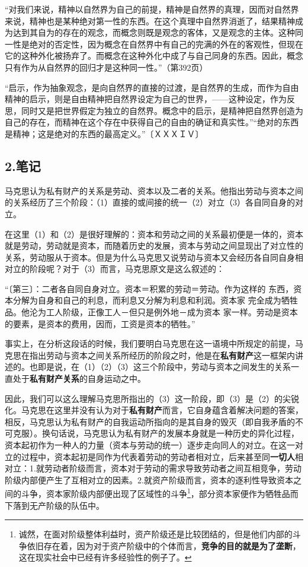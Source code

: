 \documentclass[a4paper,twoside,12pt]{ctexart}
\begin{document}
\begin{fangsong}
“对我们来说，精神以自然界为自己的前提，精神是自然界的真理，因而对自然界来说，精神也是某种绝对第一性的东西。在这个真理中自然界消逝了，结果精神成为达到其自为的存在的观念，而概念则既是观念的客体，又是观念的主体。这种同一性是绝对的否定性，因为概念在自然界中有自己的完满的外在的客观性，但现在它的这种外化被扬弃了。而概念在这种外化中成了与自己同身的东西。因此，概念只有作为从自然界的回归才是这种同一性。”（第392页）

“启示，作为抽象观念，是向自然界的直接的过渡，是自然界的生成，而作为自由精神的启示，则是自由精神把自然界设定为自己的世界，——这种设定，作为反思，同时又是把世界假定为独立的自然界。概念中的启示，是精神把自然界创造为自己的存在，而精神在这个存在中获得自己的自由的确证和真实性。”“绝对的东西是精神；这是绝对的东西的最高定义。”〔ＸＸＸＩＶ〕
\end{fangsong}

\newpage
\subsection{2.笔记}
马克思认为私有财产的关系是劳动、资本以及二者的关系。他指出劳动与资本之间的关系经历了三个阶段：（1）直接的或间接的统一（2）对立（3）各自同自身的对立。

在这里（1）和（2）是很好理解的：资本和劳动之间的关系最初便是一体的，资本就是劳动，劳动就是资本，而随着历史的发展，资本与劳动之间显现出了对立性的关系，劳动服从于资本。但是为什么马克思又说劳动与资本又会经历各自同自身相对立的阶段呢？对于（3）而言，马克思原文是这么叙述的：

\begin{fangsong}
    “〔第三〕：二者各自同自身对立。资本＝积累的劳动＝劳动。作为这样的
东西，资本分解为自身和自己的利息，而利息又分解为利息和利润。资本家
完全成为牺牲品。他沦为工人阶级，正像工人－但只是例外地－成为资本
家一样。劳动是资本的要素，是资本的费用，因而，工资是资本的牺牲。”
\end{fangsong}

事实上，在分析这段话的时候，我们要明白马克思在这一语境中所规定的前提，马克思在指出劳动与资本之间关系所经历的阶段之时，他是在\textbf{私有财产}这一框架内讲述的。也即是说，在（1）（2）（3）这三个阶段中，劳动与资本之间发生的关系一直处于\textbf{私有财产关系}的自身运动之中。

因此，我们可以这么理解马克思所指出的（3）这一阶段，即（3）是（2）的尖锐化。马克思在这里并没有认为对于\textbf{私有财产}而言，它自身蕴含着解决问题的答案，相反，马克思认为私有财产的自我运动所指向的是其自身的毁灭（即自我矛盾的不可克服）。换句话说，马克思认为私有财产的发展本身就是一种历史的异化过程，资本起初作为一种人的力量（资本与劳动的统一）逐步走向同人的对立。在这一对立的过程中，资本起初是同作为代表着劳动的劳动者相对立，后来甚至同\textbf{一切人}相对立：1.就劳动者阶级而言，资本对于劳动的需求导致劳动者之间互相竞争，劳动阶级内部便产生了互相对立的因素。2.就资产阶级而言，资本的逐利性导致资本之间的斗争，资本家阶级内部便出现了区域性的斗争\footnote{诚然，在面对阶级整体利益时，资产阶级还是比较团结的，但是他们内部的斗争依旧存在着，因为对于资产阶级中的个体而言，\textbf{竞争的目的就是为了垄断}，这在现实社会中已经有许多经验性的例子了。}，部分资本家便作为牺牲品而下落到无产阶级的队伍中。
\end{document}
